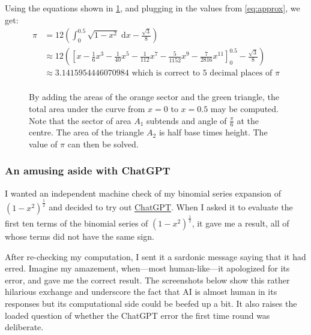 \documentclass[
  a4paper,
]{article}
\begin{document}
Using the equations shown in \cref{fig:sixty-degrees}, and plugging in
the values from \cref{eq:approx}, we get: \[
\begin{aligned}
\pi &= 12\left(\int_{0}^{0.5}\sqrt{1 - x^2}\; \mathrm{d}x - \frac{\sqrt{3}}{8} \right)\\
&\approx 12 \left(\left[x - \frac{1}{6}x^3 - \frac{1}{40}x^5 - \frac{1}{112}x^7 - \frac{5}{1152}x^9 - \frac{7}{2816}x^{11} \right]_{0}^{0.5} - \frac{\sqrt{3}}{8}\right)\\
&\approx 3.1415954446070984 \text{ which is correct to 5 decimal places of }\pi\\
\end{aligned}
\]

\begin{figure}
\centering

\caption{By adding the areas of the orange sector and the green
triangle, the total area under the curve from \(x = 0\) to \(x = 0.5\)
may be computed. Note that the sector of area \(A_1\) subtends and angle
of \(\frac{\pi}{6}\) at the centre. The area of the triangle \(A_2\) is
half base times height. The value of \(\pi\) can then be
solved.}\label{fig:sixty-degrees}
\end{figure}

\subsubsection{An amusing aside with
ChatGPT}\label{an-amusing-aside-with-chatgpt}

I wanted an independent machine check of my binomial series expansion of
\((1 -x^2)^{\frac{1}{2}}\) and decided to try out
\href{https://chatgpt.com/}{ChatGPT}. When I asked it to evaluate the
first ten terms of the binomial series of \((1-x^2)^{\frac{1}{2}}\), it
gave me a result, all of whose terms did not have the same sign.

After re-checking my computation, I sent it a sardonic message saying
that it had erred. Imagine my amazement, when---most human-like---it
apologized for its error, and gave me the correct result. The
screenshots below show this rather hilarious exchange and underscore the
fact that AI is almost human in its responses but its computational side
could be beefed up a bit. It also raises the loaded question of whether
the ChatGPT error the first time round was deliberate.
\end{document}
